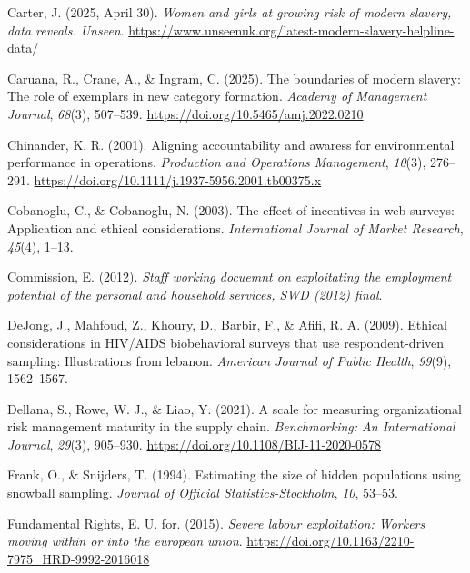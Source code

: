 \documentclass[
  12pt,
]{article}
\newlength{\cslhangindent}
\newenvironment{CSLReferences}[2] %
 {\begin{list}{}{%
  \setlength{\itemindent}{0pt}
  \setlength{\leftmargin}{0pt}
  \setlength{\parsep}{0pt}
  \ifodd #1
   \setlength{\leftmargin}{\cslhangindent}
   \setlength{\itemindent}{-1\cslhangindent}
  \fi
  \setlength{\itemsep}{#2\baselineskip}}}
 {\end{list}}
\theoremstyle{plain}
\theoremstyle{definition}
\begin{document}
\begin{CSLReferences}{1}{0}
Carter, J. (2025, April 30). \emph{Women and girls at growing risk of
modern slavery, data reveals. Unseen}.
\url{https://www.unseenuk.org/latest-modern-slavery-helpline-data/}

Caruana, R., Crane, A., \& Ingram, C. (2025). The boundaries of modern
slavery: The role of exemplars in new category formation. \emph{Academy
of Management Journal}, \emph{68}(3), 507--539.
\url{https://doi.org/10.5465/amj.2022.0210}

Chinander, K. R. (2001). Aligning accountability and awaress for
environmental performance in operations. \emph{Production and Operations
Management}, \emph{10}(3), 276--291.
\url{https://doi.org/10.1111/j.1937-5956.2001.tb00375.x}

Cobanoglu, C., \& Cobanoglu, N. (2003). The effect of incentives in web
surveys: Application and ethical considerations. \emph{International
Journal of Market Research}, \emph{45}(4), 1--13.

Commission, E. (2012). \emph{Staff working docuemnt on exploitating the
employment potential of the personal and household services, {SWD}
(2012) final}.

DeJong, J., Mahfoud, Z., Khoury, D., Barbir, F., \& Afifi, R. A. (2009).
Ethical considerations in {HIV}/{AIDS} biobehavioral surveys that use
respondent-driven sampling: Illustrations from lebanon. \emph{American
Journal of Public Health}, \emph{99}(9), 1562--1567.

Dellana, S., Rowe, W. J., \& Liao, Y. (2021). A scale for measuring
organizational risk management maturity in the supply chain.
\emph{Benchmarking: An International Journal}, \emph{29}(3), 905--930.
\url{https://doi.org/10.1108/BIJ-11-2020-0578}

Frank, O., \& Snijders, T. (1994). Estimating the size of hidden
populations using snowball sampling. \emph{Journal of Official
Statistics-Stockholm}, \emph{10}, 53--53.

Fundamental Rights, E. U. for. (2015). \emph{Severe labour exploitation:
Workers moving within or into the european union}.
\url{https://doi.org/10.1163/2210-7975_HRD-9992-2016018}


\end{CSLReferences}
\end{document}
